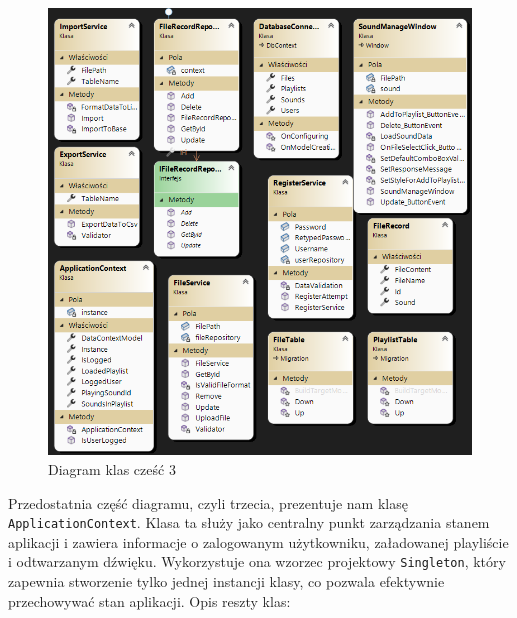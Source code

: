 \begin{figure}[!ht]
	\begin{center}
	\includegraphics[width=500pt]{figures/diagram_czesc3.png}
        \caption{{\footnotesize Diagram klas cześć 3}}
	\end{center}
\end{figure}

\newpage
{Przedostatnia część diagramu, czyli trzecia, prezentuje nam klasę \texttt{ApplicationContext}. Klasa ta służy jako centralny punkt zarządzania stanem aplikacji i zawiera informacje o zalogowanym użytkowniku, załadowanej playliście i odtwarzanym dźwięku. Wykorzystuje ona wzorzec projektowy \texttt{Singleton}, który zapewnia stworzenie tylko jednej instancji klasy, co pozwala efektywnie przechowywać stan aplikacji. Opis reszty klas: }

